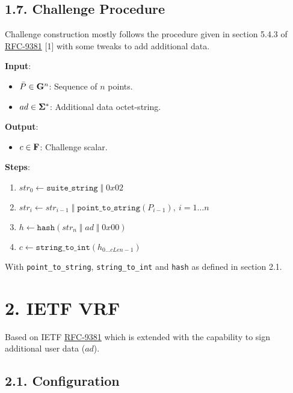 \documentclass[
]{article}
\providecommand{\tightlist}{%
  \setlength{\itemsep}{0pt}\setlength{\parskip}{0pt}}
\begin{document}
\subsection{1.7. Challenge Procedure}\label{challenge-procedure}

Challenge construction mostly follows the procedure given in section
5.4.3 of \href{https://datatracker.ietf.org/doc/rfc9381}{RFC-9381}
{[}1{]} with some tweaks to add additional data.

\textbf{Input}:

\begin{itemize}
\tightlist
\item
  \(\bar{P} \in \bold{G}^n\): Sequence of \(n\) points.
\item
  \(ad \in \bold{\Sigma}^*\): Additional data octet-string.
\end{itemize}

\textbf{Output}:

\begin{itemize}
\tightlist
\item
  \(c \in \bold{F}\): Challenge scalar.
\end{itemize}

\textbf{Steps}:

\begin{enumerate}
\def\labelenumi{\arabic{enumi}.}
\tightlist
\item
  \(str_0 \gets \texttt{suite\_string}\;\Vert\;0x02\)
\item
  \(str_i \gets str_{i-1}\;\Vert\;\texttt{point\_to\_string}(P_{i-1}),\ i = 1 \dots n\)
\item
  \(h \gets \texttt{hash}(str_n\;\Vert\;ad\;\Vert\;0x00)\)
\item
  \(c \gets \texttt{string\_to\_int}(h_{0 \dots cLen - 1})\)
\end{enumerate}

With \texttt{point\_to\_string}, \texttt{string\_to\_int} and
\texttt{hash} as defined in section 2.1.

\section{2. IETF VRF}\label{ietf-vrf}

Based on IETF \href{https://datatracker.ietf.org/doc/rfc9381}{RFC-9381}
which is extended with the capability to sign additional user data
(\(ad\)).

\subsection{2.1. Configuration}\label{configuration}
\end{document}
